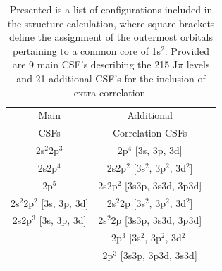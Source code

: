 \begin{table}[t]
\footnotesize
\begin{center}
\begin{tabular}{@{} l *2c @{}}
\toprule

\multicolumn{1}{c}{Main} & \multicolumn{1}{c}{Additional}  \\
\multicolumn{1}{c}{CSFs} & \multicolumn{1}{c}{Correlation CSFs}  \\

\toprule
       \multicolumn{1}{c}{2s$^2$2p$^3$} & 2p$^4$ [3s, 3p, 3d] \\
        \multicolumn{1}{c}{2s2p$^4$} & 2s2p$^2$ [3s$^2$, 3p$^2$, 3d$^2$] \\
       \multicolumn{1}{c}{2p$^5$} & 2s2p$^2$ [3s3p, 3s3d, 3p3d] \\
          \multicolumn{1}{c}{2s$^2$2p$^2$ [3s, 3p, 3d]}   & 2s$^2$2p [3s$^2$, 3p$^2$, 3d$^2$] \\
           \multicolumn{1}{c}{2s2p$^3$ [3s, 3p, 3d]} & 2s$^2$2p [3s3p, 3s3d, 3p3d] \\
                    & 2p$^3$ [3s$^2$, 3p$^2$, 3d$^2$] \\
                    & 2p$^3$ [3s3p, 3p3d, 3s3d] \\
\bottomrule
 \end{tabular}
 \caption{Presented is a list of configurations included in the structure calculation, where square brackets define the assignment of the outermost orbitals pertaining to a common core of 1s$^2$. Provided are 9 main CSF's describing the 215 J$\pi$ levels and 21 additional CSF's for the inclusion of extra correlation. \label{tab:sul_ci}}
 \end{center}
\end{table}


